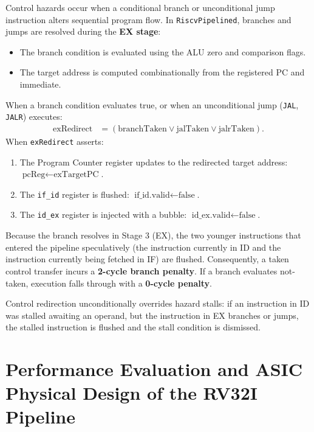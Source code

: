 Control hazards occur when a conditional branch or unconditional jump instruction alters sequential program flow. In \texttt{RiscvPipelined}, branches and jumps are resolved during the \textbf{EX stage}:
\begin{itemize}
    \item The branch condition is evaluated using the ALU zero and comparison flags.
    \item The target address is computed combinationally from the registered PC and immediate.
\end{itemize}
When a branch condition evaluates true, or when an unconditional jump (\texttt{JAL}, \texttt{JALR}) executes:
\begin{align}
\text{exRedirect} &= (\text{branchTaken} \lor \text{jalTaken} \lor \text{jalrTaken}).
\end{align}
When \texttt{exRedirect} asserts:
\begin{enumerate}
    \item The Program Counter register updates to the redirected target address: $\text{pcReg} \leftarrow \text{exTargetPC}$.
    \item The \texttt{if\_id} register is flushed: $\text{if\_id.valid} \leftarrow \text{false}$.
    \item The \texttt{id\_ex} register is injected with a bubble: $\text{id\_ex.valid} \leftarrow \text{false}$.
\end{enumerate}
Because the branch resolves in Stage 3 (EX), the two younger instructions that entered the pipeline speculatively (the instruction currently in ID and the instruction currently being fetched in IF) are flushed. Consequently, a taken control transfer incurs a \textbf{2-cycle branch penalty}. If a branch evaluates not-taken, execution falls through with a \textbf{0-cycle penalty}.

Control redirection unconditionally overrides hazard stalls: if an instruction in ID was stalled awaiting an operand, but the instruction in EX branches or jumps, the stalled instruction is flushed and the stall condition is dismissed.


\section{Performance Evaluation and ASIC Physical Design of the RV32I Pipeline}\label{riscvPerformance}

